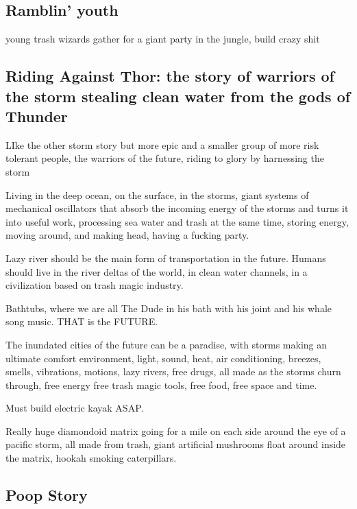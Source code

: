 \subsection{Ramblin' youth}\label{ramblin-youth}

young trash wizards gather for a giant party in the jungle, build crazy
shit

\subsection{Riding Against Thor: the story of warriors of the storm
stealing clean water from the gods of
Thunder}\label{riding-against-thor-the-story-of-warriors-of-the-storm-stealing-clean-water-from-the-gods-of-thunder}

LIke the other storm story but more epic and a smaller group of more
risk tolerant people, the warriors of the future, riding to glory by
harnessing the storm

Living in the deep ocean, on the surface, in the storms, giant systems
of mechanical oscillators that absorb the incoming energy of the storms
and turns it into useful work, processing sea water and trash at the
same time, storing energy, moving around, and making head, having a
fucking party.

Lazy river should be the main form of transportation in the future.
Humans should live in the river deltas of the world, in clean water
channels, in a civilization based on trash magic industry.

Bathtubs, where we are all The Dude in his bath with his joint and his
whale song music. THAT is the FUTURE.

The inundated cities of the future can be a paradise, with storms making
an ultimate comfort environment, light, sound, heat, air conditioning,
breezes, smells, vibrations, motions, lazy rivers, free drugs, all made
as the storms churn through, free energy free trash magic tools, free
food, free space and time.

Must build electric kayak ASAP.

Really huge diamondoid matrix going for a mile on each side around the
eye of a pacific storm, all made from trash, giant artificial mushrooms
float around inside the matrix, hookah smoking caterpillars.

\subsection{Poop Story}\label{poop-story}

